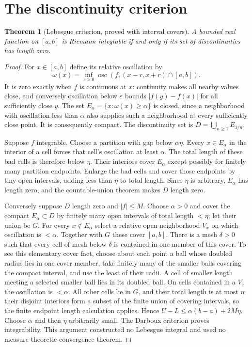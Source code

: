 \documentclass[11pt,oneside,a4paper]{book}
\newtheorem{theorem}{Theorem}[chapter]
\theoremstyle{definition}
\theoremstyle{remark}
\newcommand{\eps}{\varepsilon}
\DeclareMathOperator{\osc}{osc}
\newcommand{\KEntry}[2]{\Needspace{7\baselineskip}\section{#2}\label{#1}{\small\sffamily\color{black!60}\detokenize{#1}}\par}
\begin{document}
\KEntry{K03.08.oscillation_criterion}{The discontinuity criterion}
\begin{theorem}[Lebesgue criterion, proved with interval covers]
A bounded real function on $[a,b]$ is Riemann integrable if and only if
its set of discontinuities has length zero.
\end{theorem}
\begin{proof}
For $x\in[a,b]$ define its relative oscillation by
\[\omega(x)=\inf_{r>0}\osc(f,(x-r,x+r)\cap[a,b]).\]
It is zero exactly when $f$ is continuous at $x$: continuity makes all
nearby values close, and conversely oscillation below $\eps$ bounds
$|f(y)-f(x)|$ for all sufficiently close $y$. The set
$E_\alpha=\{x:\omega(x)\ge\alpha\}$ is closed, since a neighborhood
with oscillation less than $\alpha$ also supplies such a neighborhood
at every sufficiently close point. It is consequently compact.
The discontinuity set is $D=\bigcup_{n\ge1}E_{1/n}$.

Suppose $f$ integrable. Choose a partition with gap below $\alpha\eta$.
Every $x\in E_\alpha$ in the interior of a cell forces that cell's
oscillation at least $\alpha$. The total length of these bad cells
is therefore below $\eta$. Their interiors cover $E_\alpha$ except
possibly for finitely many partition endpoints. Enlarge the bad cells
and cover those endpoints by tiny open intervals, adding less than $\eta$
to total length. Since $\eta$ is arbitrary, $E_\alpha$ has length zero,
and the countable-union theorem makes $D$ length zero.

Conversely suppose $D$ length zero and $|f|\le M$.
Choose $\alpha>0$ and cover the compact $E_\alpha\subset D$ by finitely
many open intervals of total length $<\eta$; let their union be $G$.
For every $x\notin E_\alpha$ select a relative open neighborhood $V_x$
on which oscillation is $<\alpha$. Together with $G$ these cover $[a,b]$.
There is a mesh $\delta>0$ such that every cell of mesh below $\delta$
is contained in one member of this cover. To see this elementary cover
fact, choose about each point a ball whose doubled radius lies in one
cover member, take finitely many of the smaller balls covering the compact
interval, and use the least of their radii. A cell of smaller length
meeting a selected smaller ball lies in its doubled ball.
On cells contained in a $V_x$ the oscillation is $<\alpha$.
All other cells lie in $G$, and their total length is at most $\eta$:
their disjoint interiors form a subset of the finite union of covering
intervals, so the finite endpoint length calculation applies.
Hence $U-L\le\alpha(b-a)+2M\eta$. Choose $\alpha$ and then $\eta$
arbitrarily small. The Darboux criterion proves integrability.
This argument constructed no Lebesgue integral and used no measure-theoretic
convergence theorem.
\end{proof}
\end{document}
